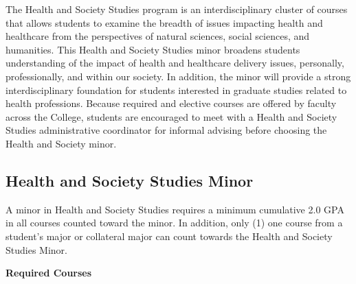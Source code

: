 \documentclass[
  letterpaper,
]{scrbook}
\begin{document}
The Health and Society Studies program is an interdisciplinary cluster
of courses that allows students to examine the breadth of issues
impacting health and healthcare from the perspectives of natural
sciences, social sciences, and humanities. This Health and Society
Studies minor broadens students understanding of the impact of health
and healthcare delivery issues, personally, professionally, and within
our society. In addition, the minor will provide a strong
interdisciplinary foundation for students interested in graduate studies
related to health professions. Because required and elective courses are
offered by faculty across the College, students are encouraged to meet
with a Health and Society Studies administrative coordinator for
informal advising before choosing the Health and Society minor.

\subsection{Health and Society Studies
Minor}\label{health-and-society-studies-minor}

A minor in Health and Society Studies requires a minimum cumulative 2.0
GPA in all courses counted toward the minor. In addition, only (1) one
course from a student's major or collateral major can count towards the
Health and Society Studies Minor.

\textbf{Required Courses}
\end{document}
